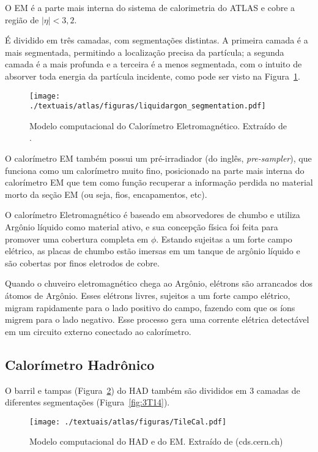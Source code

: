 O \ac{EM} \cite{calorimeter2008construction} é a parte mais interna do sistema de calorimetria do ATLAS e cobre a região de $|\eta| < 3,2$.

É dividido em três camadas, com segmentações distintas.  A primeira camada é a mais segmentada, permitindo a localização precisa da partícula; a segunda camada é a mais profunda e a terceira é a menos segmentada, com o intuito de absorver toda energia da partícula incidente, como pode ser visto na Figura~\ref{fig:3T07}.

\begin{figure}[h!]
	\centering
	\texttt{[image: ./textuais/atlas/figuras/liquidargon\_segmentation.pdf]}\\
	\caption{Modelo computacional do Calorímetro Eletromagnético. Extraído de \cite{francavilla2012atlas}.}
	\label{fig:3T07}
\end{figure}

O calorímetro EM também possui um pré-irradiador (do inglês, \emph{pre-sampler}), que funciona como um calorímetro muito fino, posicionado na parte mais interna do calorímetro EM que tem como função recuperar a informação perdida no material morto da seção EM (ou seja, fios, encapamentos, etc).
		
O calorímetro Eletromagnético é baseado em absorvedores de chumbo e utiliza Argônio líquido como material ativo, e sua concepção física foi feita para promover uma cobertura completa em $\phi$. Estando sujeitas a um forte campo elétrico, as placas de chumbo estão imersas em um tanque de argônio líquido e são cobertas por finos eletrodos de cobre.

Quando o chuveiro eletromagnético chega ao Argônio, elétrons são arrancados dos átomos de Argônio.  Esses elétrons livres, sujeitos a um forte campo elétrico, migram rapidamente para o lado positivo do campo, fazendo com que os íons migrem para o lado negativo. Esse processo gera uma corrente elétrica detectável em um circuito externo conectado ao calorímetro.


\subsection{Calorímetro Hadrônico}

O barril e tampas (Figura~\ref{fig:3T10}) do \ac{HAD} \cite{aad2010readiness} também são divididos em 3 camadas de diferentes segmentações (Figura~\ref{fig:3T14}).

\begin{figure}[h!]
	\centering
	\texttt{[image: ./textuais/atlas/figuras/TileCal.pdf]}\\
	\caption{Modelo computacional do HAD e do EM. Extraído de (cds.cern.ch)}
	\label{fig:3T10}
\end{figure}

